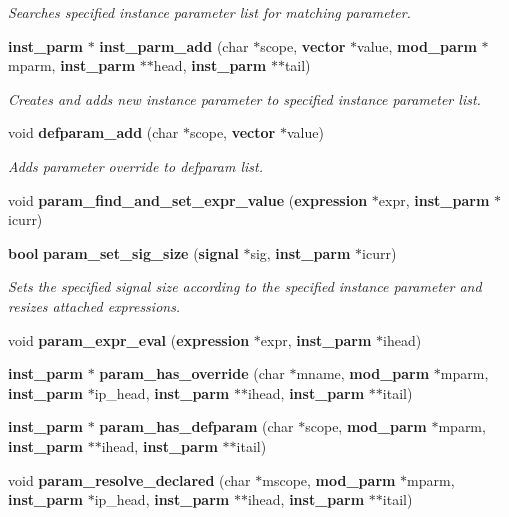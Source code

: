 \begin{CompactItemize}
\begin{CompactList}\small\item\em Searches specified instance parameter list for matching parameter. \item\end{CompactList}\item 
{\bf inst\_\-parm} $\ast$ {\bf inst\_\-parm\_\-add} (char $\ast$scope, {\bf vector} $\ast$value, {\bf mod\_\-parm} $\ast$mparm, {\bf inst\_\-parm} $\ast$$\ast$head, {\bf inst\_\-parm} $\ast$$\ast$tail)
\begin{CompactList}\small\item\em Creates and adds new instance parameter to specified instance parameter list. \item\end{CompactList}\item 
void {\bf defparam\_\-add} (char $\ast$scope, {\bf vector} $\ast$value)
\begin{CompactList}\small\item\em Adds parameter override to defparam list. \item\end{CompactList}\item 
void {\bf param\_\-find\_\-and\_\-set\_\-expr\_\-value} ({\bf expression} $\ast$expr, {\bf inst\_\-parm} $\ast$icurr)
\item 
{\bf bool} {\bf param\_\-set\_\-sig\_\-size} ({\bf signal} $\ast$sig, {\bf inst\_\-parm} $\ast$icurr)
\begin{CompactList}\small\item\em Sets the specified signal size according to the specified instance parameter and resizes attached expressions. \item\end{CompactList}\item 
void {\bf param\_\-expr\_\-eval} ({\bf expression} $\ast$expr, {\bf inst\_\-parm} $\ast$ihead)
\item 
{\bf inst\_\-parm} $\ast$ {\bf param\_\-has\_\-override} (char $\ast$mname, {\bf mod\_\-parm} $\ast$mparm, {\bf inst\_\-parm} $\ast$ip\_\-head, {\bf inst\_\-parm} $\ast$$\ast$ihead, {\bf inst\_\-parm} $\ast$$\ast$itail)
\item 
{\bf inst\_\-parm} $\ast$ {\bf param\_\-has\_\-defparam} (char $\ast$scope, {\bf mod\_\-parm} $\ast$mparm, {\bf inst\_\-parm} $\ast$$\ast$ihead, {\bf inst\_\-parm} $\ast$$\ast$itail)
\item 
void {\bf param\_\-resolve\_\-declared} (char $\ast$mscope, {\bf mod\_\-parm} $\ast$mparm, {\bf inst\_\-parm} $\ast$ip\_\-head, {\bf inst\_\-parm} $\ast$$\ast$ihead, {\bf inst\_\-parm} $\ast$$\ast$itail)

\end{CompactItemize}
